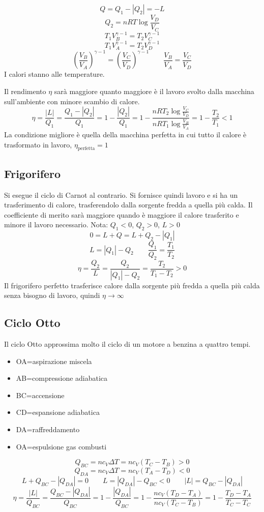 \[Q=Q_1-|Q_2|=-L\]
\[Q_2=nRT\log\frac{V_D}{V_C}\]
\[T_1V_B^{\gamma-1}=T_2V_C^{\gamma-1}\]
\[T_1V_A^{\gamma-1}=T_2V_D^{\gamma-1}\]
\[\left(\frac{V_B}{V_A}\right)^{\gamma-1}=\left(\frac{V_C}{V_D}\right)^{\gamma-1}\qquad \frac{V_B}{V_A}=\frac{V_C}{V_D}\]
I calori stanno alle temperature.

Il rendimento $\eta$ sarà maggiore quanto maggiore è il lavoro svolto dalla macchina sull'ambiente con minore scambio di calore.
\[\eta=\frac{|L|}{Q_1}=\frac{Q_1-|Q_2|}{Q_1}=1-\frac{|Q_2|}{Q_1}=1-\frac{nRT_2\log\frac{V_C}{V_D}}{nRT_1\log\frac{V_B}{V_A}}=1-\frac{T_2}{T_1}<1\]
La condizione migliore è quella della macchina perfetta in cui tutto il calore è trasformato in lavoro, $\eta_\text{perfetta}= 1$

\subsection{Frigorifero}
Si esegue il ciclo di Carnot al contrario. Si fornisce quindi lavoro e si ha un trasferimento di calore, trasferendolo dalla sorgente fredda a quella più calda.
Il coefficiente di merito sarà maggiore quando è maggiore il calore trasferito e minore il lavoro necessario.
Nota: $Q_1<0$, $Q_2>0$, $L>0$
\[0=L+Q=L+Q_2-|Q_1|\]
\[L=|Q_1|-Q_2\qquad\frac{Q_1}{Q_2}=\frac{T_1}{T_2}\]
\[\eta=\frac{Q_2}{L}=\frac{Q_2}{|Q_1|-Q_2}=\frac{T_2}{T_1-T_2}>0\]
Il frigorifero perfetto trasferisce calore dalla sorgente più fredda a quella più calda senza bisogno di lavoro, quindi $\eta\rightarrow\infty$

\subsection{Ciclo Otto}
Il ciclo Otto approssima molto il ciclo di un motore a benzina a quattro tempi.
\begin{itemize}
\item[] OA=aspirazione miscela
\item[] AB=compressione adiabatica
\item[] BC=accensione
\item[] CD=espansione adiabatica
\item[] DA=raffreddamento
\item[] OA=espulsione gas combusti
\end{itemize}

\[Q_{BC}=nc_V\Delta T=nc_V(T_C-T_B)>0\]
\[Q_{DA}=nc_V\Delta T=nc_V(T_A-T_D)<0\]
\[L+Q_{BC}-|Q_{DA}|=0 \qquad L=|Q_{DA}|-Q_{BC}<0\qquad |L|=Q_{BC}-|Q_{DA}|\]
\[\eta=\frac{|L|}{Q_{BC}}=\frac{Q_{BC}-|Q_{DA}|}{Q_{BC}}=1-\frac{|Q_{DA}|}{Q_{BC}}=1-\frac{nc_V(T_D-T_A)}{nc_V(T_C-T_B)}=1-\frac{T_D-T_A}{T_C-T_C}\]

